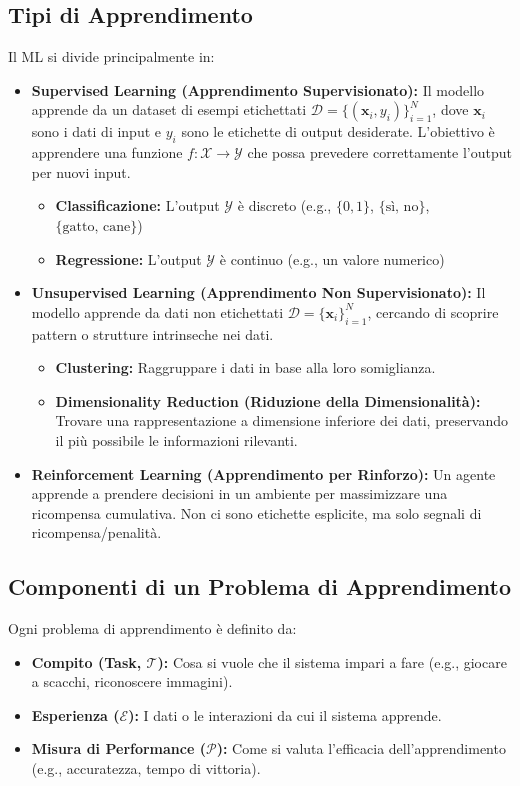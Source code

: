 \documentclass[a4paper,11pt]{article}
\begin{document}
\subsection{Tipi di Apprendimento}
Il ML si divide principalmente in:
\begin{itemize}
    \item \textbf{Supervised Learning (Apprendimento Supervisionato):} Il modello apprende da un dataset di esempi etichettati $\mathcal{D} = \{(\mathbf{x}_i, y_i)\}_{i=1}^N$, dove $\mathbf{x}_i$ sono i dati di input e $y_i$ sono le etichette di output desiderate. L'obiettivo è apprendere una funzione $f: \mathcal{X} \to \mathcal{Y}$ che possa prevedere correttamente l'output per nuovi input.
    \begin{itemize}
        \item \textbf{Classificazione:} L'output $\mathcal{Y}$ è discreto (e.g., $\{0, 1\}$, $\{\text{sì, no}\}$, $\{\text{gatto, cane}\}$)
        \item \textbf{Regressione:} L'output $\mathcal{Y}$ è continuo (e.g., un valore numerico)
    \end{itemize}
    \item \textbf{Unsupervised Learning (Apprendimento Non Supervisionato):} Il modello apprende da dati non etichettati $\mathcal{D} = \{\mathbf{x}_i\}_{i=1}^N$, cercando di scoprire pattern o strutture intrinseche nei dati.
    \begin{itemize}
        \item \textbf{Clustering:} Raggruppare i dati in base alla loro somiglianza.
        \item \textbf{Dimensionality Reduction (Riduzione della Dimensionalità):} Trovare una rappresentazione a dimensione inferiore dei dati, preservando il più possibile le informazioni rilevanti.
    \end{itemize}
    \item \textbf{Reinforcement Learning (Apprendimento per Rinforzo):} Un agente apprende a prendere decisioni in un ambiente per massimizzare una ricompensa cumulativa. Non ci sono etichette esplicite, ma solo segnali di ricompensa/penalità.
\end{itemize}

\subsection{Componenti di un Problema di Apprendimento}
Ogni problema di apprendimento è definito da:
\begin{itemize}
    \item \textbf{Compito (Task, $\mathcal{T}$):} Cosa si vuole che il sistema impari a fare (e.g., giocare a scacchi, riconoscere immagini).
    \item \textbf{Esperienza ($\mathcal{E}$):} I dati o le interazioni da cui il sistema apprende.
    \item \textbf{Misura di Performance ($\mathcal{P}$):} Come si valuta l'efficacia dell'apprendimento (e.g., accuratezza, tempo di vittoria).
\end{itemize}
\end{document}
